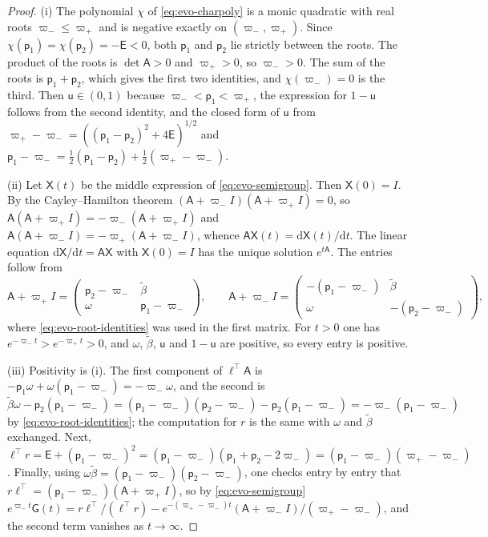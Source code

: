 \begin{proof}
(i) The polynomial $\chi$ of \eqref{eq:evo-charpoly} is a monic quadratic with real roots $\varpi_-\le\varpi_+$ and is negative exactly on $(\varpi_-,\varpi_+)$. Since $\chi(\mathsf p_1)=\chi(\mathsf p_2)=-\mathsf E<0$, both $\mathsf p_1$ and $\mathsf p_2$ lie strictly between the roots. The product of the roots is $\det\mathsf A>0$ and $\varpi_+>0$, so $\varpi_->0$. The sum of the roots is $\mathsf p_1+\mathsf p_2$, which gives the first two identities, and $\chi(\varpi_-)=0$ is the third. Then $\mathsf u\in(0,1)$ because $\varpi_-<\mathsf p_1<\varpi_+$, the expression for $1-\mathsf u$ follows from the second identity, and the closed form of $\mathsf u$ from $\varpi_+-\varpi_-=((\mathsf p_1-\mathsf p_2)^2+4\mathsf E)^{1/2}$ and $\mathsf p_1-\varpi_-=\frac12(\mathsf p_1-\mathsf p_2)+\frac12(\varpi_+-\varpi_-)$.

(ii) Let $\mathsf X(t)$ be the middle expression of \eqref{eq:evo-semigroup}. Then $\mathsf X(0)=I$. By the Cayley--Hamilton theorem $(\mathsf A+\varpi_-I)(\mathsf A+\varpi_+I)=0$, so $\mathsf A(\mathsf A+\varpi_+I)=-\varpi_-(\mathsf A+\varpi_+I)$ and $\mathsf A(\mathsf A+\varpi_-I)=-\varpi_+(\mathsf A+\varpi_-I)$, whence $\mathsf A\mathsf X(t)=\mathrm d\mathsf X(t)/\mathrm dt$. The linear equation $\mathrm d\mathsf X/\mathrm dt=\mathsf A\mathsf X$ with $\mathsf X(0)=I$ has the unique solution $e^{t\mathsf A}$. The entries follow from
\begin{equation*}
\mathsf A+\varpi_+I=\begin{pmatrix}\mathsf p_2-\varpi_-&\tilde\beta\\\omega&\mathsf p_1-\varpi_-\end{pmatrix},\qquad\mathsf A+\varpi_-I=\begin{pmatrix}-(\mathsf p_1-\varpi_-)&\tilde\beta\\\omega&-(\mathsf p_2-\varpi_-)\end{pmatrix},
\end{equation*}
where \eqref{eq:evo-root-identities} was used in the first matrix. For $t>0$ one has $e^{-\varpi_-t}>e^{-\varpi_+t}>0$, and $\omega$, $\tilde\beta$, $\mathsf u$ and $1-\mathsf u$ are positive, so every entry is positive.

(iii) Positivity is (i). The first component of $\ell^\top\mathsf A$ is $-\mathsf p_1\omega+\omega(\mathsf p_1-\varpi_-)=-\varpi_-\omega$, and the second is $\tilde\beta\omega-\mathsf p_2(\mathsf p_1-\varpi_-)=(\mathsf p_1-\varpi_-)(\mathsf p_2-\varpi_-)-\mathsf p_2(\mathsf p_1-\varpi_-)=-\varpi_-(\mathsf p_1-\varpi_-)$ by \eqref{eq:evo-root-identities}; the computation for $r$ is the same with $\omega$ and $\tilde\beta$ exchanged. Next, $\ell^\top r=\mathsf E+(\mathsf p_1-\varpi_-)^2=(\mathsf p_1-\varpi_-)(\mathsf p_1+\mathsf p_2-2\varpi_-)=(\mathsf p_1-\varpi_-)(\varpi_+-\varpi_-)$. Finally, using $\omega\tilde\beta=(\mathsf p_1-\varpi_-)(\mathsf p_2-\varpi_-)$, one checks entry by entry that $r\ell^\top=(\mathsf p_1-\varpi_-)(\mathsf A+\varpi_+I)$, so by \eqref{eq:evo-semigroup} $e^{\varpi_-t}\mathsf G(t)=r\ell^\top/(\ell^\top r)-e^{-(\varpi_+-\varpi_-)t}(\mathsf A+\varpi_-I)/(\varpi_+-\varpi_-)$, and the second term vanishes as $t\to\infty$.


\end{proof}
